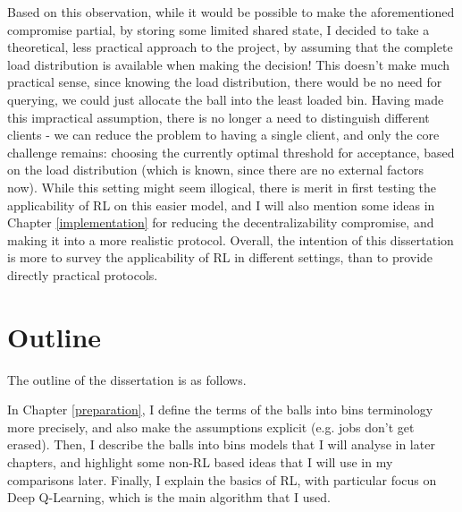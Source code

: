 Based on this observation, while it would be possible to make the aforementioned compromise partial, by storing some limited shared state, I decided to take a theoretical, less practical approach to the project, by assuming that the complete load distribution is available when making the decision! This doesn't make much practical sense, since knowing the load distribution, there would be no need for querying, we could just allocate the ball into the least loaded bin. Having made this impractical assumption, there is no longer a need to distinguish different clients - we can reduce the problem to having a single client, and only the core challenge remains: choosing the currently optimal threshold for acceptance, based on the load distribution (which is known, since there are no external factors now). While this setting might seem illogical, there is merit in first testing the applicability of RL on this easier model, and I will also mention some ideas in Chapter \ref{implementation} for reducing the decentralizability compromise, and making it into a more realistic protocol. Overall, the intention of this dissertation is more to survey the applicability of RL in different settings, than to provide directly practical protocols.



\section{Outline}

The outline of the dissertation is as follows.


In Chapter \ref{preparation}, I define the terms of the balls into bins terminology more precisely, and also make the assumptions explicit (e.g. jobs don't get erased). Then, I describe the balls into bins models that I will analyse in later chapters, and highlight some non-RL based ideas that I will use in my comparisons later. Finally, I explain the basics of RL, with particular focus on Deep Q-Learning, which is the main algorithm that I used.


